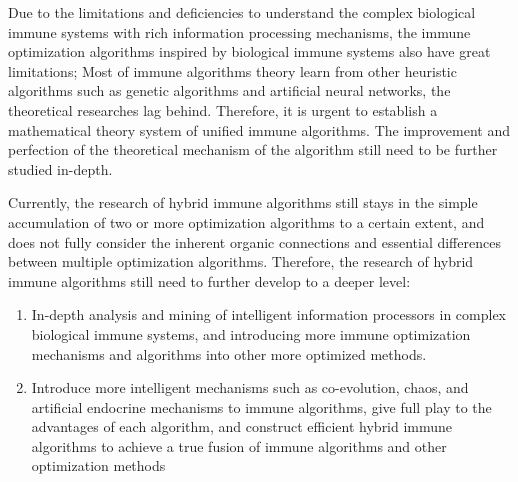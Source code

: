 \documentclass[11pt,a4paper,oldfontcommands]{memoir}
\begin{document}
Due to the limitations and deficiencies to understand the complex biological immune systems with rich information processing mechanisms, the immune optimization algorithms inspired by biological immune systems also have great limitations; Most of immune algorithms theory learn from other heuristic algorithms such as genetic algorithms and artificial neural networks, the theoretical researches lag behind. Therefore, it is urgent to establish a mathematical theory system of unified immune algorithms. The improvement and perfection of the theoretical mechanism of the algorithm still need to be further studied in-depth.

Currently, the research of hybrid immune algorithms still stays in the simple accumulation of two or more optimization algorithms to a certain extent, and does not fully consider the inherent organic connections and essential differences between multiple optimization algorithms. Therefore, the research of hybrid immune algorithms still need to further develop to a deeper level: 
\begin{enumerate}
\item{In-depth analysis and mining of intelligent information processors in complex biological immune systems, and introducing more immune optimization mechanisms and algorithms into other more optimized methods.}
\item{Introduce more intelligent mechanisms such as co-evolution, chaos, and artificial endocrine mechanisms to immune algorithms, give full play to the advantages of each algorithm, and construct efficient hybrid immune algorithms to achieve a true fusion of immune algorithms and other optimization methods}
\end{enumerate}
\end{document}
